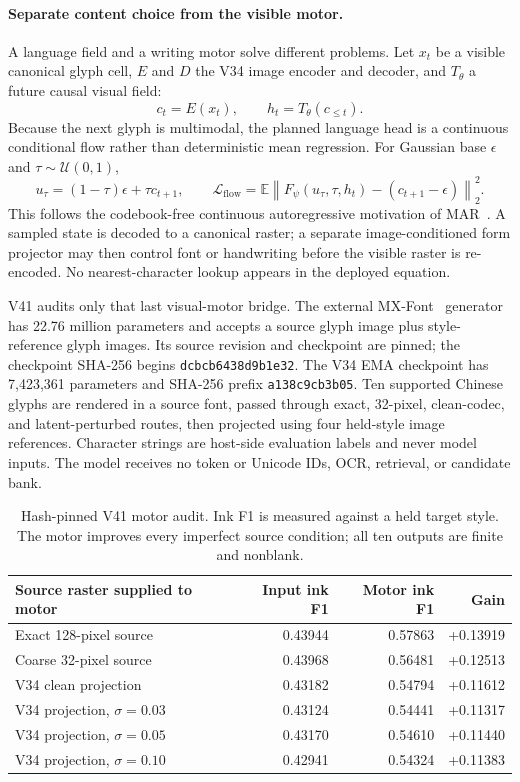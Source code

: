 \documentclass[11pt]{article}
\begin{document}
\paragraph{Separate content choice from the visible motor.}
A language field and a writing motor solve different problems. Let $x_t$ be a
visible canonical glyph cell, $E$ and $D$ the V34 image encoder and decoder,
and $T_\theta$ a future causal visual field:
\[
c_t=E(x_t),\qquad h_t=T_\theta(c_{\leq t}).
\]
Because the next glyph is multimodal, the planned language head is a continuous
conditional flow rather than deterministic mean regression. For Gaussian base
$\epsilon$ and $\tau\sim\mathcal U(0,1)$,
\[
u_\tau=(1-\tau)\epsilon+\tau c_{t+1},\qquad
\mathcal L_{\mathrm{flow}}=
\mathbb E\left\|F_\psi(u_\tau,\tau,h_t)-(c_{t+1}-\epsilon)\right\|_2^2.
\]
This follows the codebook-free continuous autoregressive motivation of
MAR~\cite{mar}. A sampled state is decoded to a canonical raster; a separate
image-conditioned form projector may then control font or handwriting before
the visible raster is re-encoded. No nearest-character lookup appears in the
deployed equation.

V41 audits only that last visual-motor bridge. The external
MX-Font~\cite{mxfont} generator has 22.76 million parameters and accepts a source
glyph image plus style-reference glyph images. Its source revision and
checkpoint are pinned; the checkpoint SHA-256 begins
\texttt{dcbcb6438d9b1e32}. The V34 EMA checkpoint has 7,423,361 parameters and
SHA-256 prefix \texttt{a138c9cb3b05}. Ten supported Chinese glyphs are rendered
in a source font, passed through exact, 32-pixel, clean-codec, and
latent-perturbed routes, then projected using four held-style image references.
Character strings are host-side evaluation labels and never model inputs. The
model receives no token or Unicode IDs, OCR, retrieval, or candidate bank.

\begin{table}[h!]
\centering
\small
\begin{tabular}{lrrr}
\toprule
Source raster supplied to motor & Input ink F1 & Motor ink F1 & Gain \\
\midrule
Exact 128-pixel source & 0.43944 & 0.57863 & +0.13919 \\
Coarse 32-pixel source & 0.43968 & 0.56481 & +0.12513 \\
V34 clean projection & 0.43182 & 0.54794 & +0.11612 \\
V34 projection, $\sigma=0.03$ & 0.43124 & 0.54441 & +0.11317 \\
V34 projection, $\sigma=0.05$ & 0.43170 & 0.54610 & +0.11440 \\
V34 projection, $\sigma=0.10$ & 0.42941 & 0.54324 & +0.11383 \\
\bottomrule
\end{tabular}
\caption{Hash-pinned V41 motor audit. Ink F1 is measured against a held target
style. The motor improves every imperfect source condition; all ten outputs are
finite and nonblank.}
\label{tab:v41motor}
\end{table}
\end{document}
